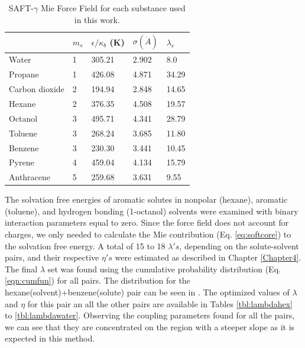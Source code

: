 \begin{table}[h]
\centering
  \caption{SAFT-$\gamma$ Mie Force Field for each substance used in this work.}
  \label{tbl:parameters}
  \begin{tabular}{lllll}
      \hline
      \hline
                     & $m_s$ & $\epsilon/\kappa_{b}$ (K) & $\sigma (\dot{A})$ & $\lambda_r$ \\ \hline
      Water          & 1     & 305.21               & 2.902              & 8.0         \\
      Propane        & 1     & 426.08               & 4.871              & 34.29       \\
      Carbon dioxide & 2     & 194.94               & 2.848              & 14.65       \\
      Hexane         & 2     & 376.35               & 4.508              & 19.57       \\
      Octanol        & 3     & 495.71               & 4.341              & 28.79       \\
      Toluene        & 3     & 268.24               & 3.685              & 11.80       \\
      Benzene        & 3     & 230.30               & 3.441              & 10.45       \\
      Pyrene         & 4     & 459.04               & 4.134              & 15.79       \\
      Anthracene     & 5     & 259.68               & 3.631              & 9.55        \\ 
      \hline
      \hline
  \end{tabular}

\end{table}
\FloatBarrier
The solvation free energies of aromatic solutes in nonpolar (hexane), aromatic (toluene), and hydrogen bonding (1-octanol) solvents were examined with binary interaction parameters equal to zero. Since the force field does not account for charges, we only needed to calculate the Mie contribution (Eq. \eqref{eq:softcore}) to the solvation free energy. A total of 15 to 18 $\lambda 's$, depending on the solute-solvent pairs, and their respective $\eta 's$ were estimated as described in Chapter \ref{Chapter4}. The final $\lambda$ set was found using  the cumulative probability distribution (Eq. \eqref{eqn:cumfun}) for all pairs. The distribution for the hexane(solvent)+benzene(solute) pair can be seen in . The optimized values of $\lambda$ and $\eta$ for this pair an all the other pairs are available in Tables \ref{tbl:lambdahex} to \ref{tbl:lambdawater}. Observing the coupling parameters found for all the pairs, we can see that they are concentrated on the region with a steeper slope as it is expected in this method.

